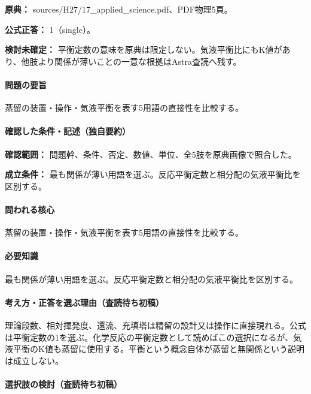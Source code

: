 \noindent\textbf{原典：} sources/H27/17\_applied\_science.pdf、PDF物理5頁。

\textbf{公式正答：} 1（single）。

\par\textbf{検討未確定：} 平衡定数の意味を原典は限定しない。気液平衡比にもK値があり、他肢より関係が薄いことの一意な根拠はAstra査読へ残す。

\paragraph{問題の要旨} 蒸留の装置・操作・気液平衡を表す5用語の直接性を比較する。

\paragraph{確認した条件・記述（独自要約）}\mbox{}\par

\noindent\textbf{確認範囲：} 問題幹、条件、否定、数値、単位、全5肢を原典画像で照合した。\par

\noindent\textbf{成立条件：} 最も関係が薄い用語を選ぶ。反応平衡定数と相分配の気液平衡比を区別する。\par

\paragraph{問われる核心} 蒸留の装置・操作・気液平衡を表す5用語の直接性を比較する。

\paragraph{必要知識} 最も関係が薄い用語を選ぶ。反応平衡定数と相分配の気液平衡比を区別する。

\paragraph{考え方・正答を選ぶ理由（査読待ち初稿）} 理論段数、相対揮発度、還流、充填塔は精留の設計又は操作に直接現れる。公式は平衡定数の1を選ぶ。化学反応の平衡定数として読めばこの選択になるが、気液平衡のK値も蒸留に使用する。平衡という概念自体が蒸留と無関係という説明は成立しない。

\paragraph{選択肢の検討（査読待ち初稿）}\mbox{}\par

